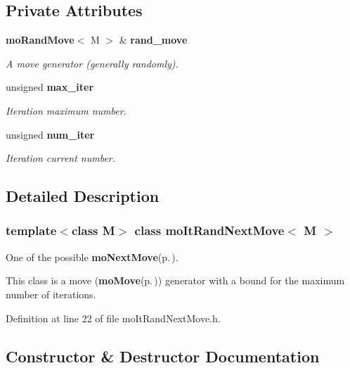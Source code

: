 \subsection*{Private Attributes}
\begin{CompactItemize}
\item 
{\bf mo\-Rand\-Move}$<$ M $>$ \& {\bf rand\_\-move}\label{classmo_it_rand_next_move_ef9410ec5e7dfa7f002e05967931c459}

\begin{CompactList}\small\item\em A move generator (generally randomly). \item\end{CompactList}\item 
unsigned {\bf max\_\-iter}\label{classmo_it_rand_next_move_3c476f7cc089b171493c52965f920542}

\begin{CompactList}\small\item\em Iteration maximum number. \item\end{CompactList}\item 
unsigned {\bf num\_\-iter}\label{classmo_it_rand_next_move_c3551d7910cf351d63f0f3427fc18504}

\begin{CompactList}\small\item\em Iteration current number. \item\end{CompactList}\end{CompactItemize}


\subsection{Detailed Description}
\subsubsection*{template$<$class M$>$ class mo\-It\-Rand\-Next\-Move$<$ M $>$}

One of the possible {\bf mo\-Next\-Move}{\rm (p.\,\pageref{classmo_next_move})}. 

This class is a move ({\bf mo\-Move}{\rm (p.\,\pageref{classmo_move})}) generator with a bound for the maximum number of iterations. 



Definition at line 22 of file mo\-It\-Rand\-Next\-Move.h.

\subsection{Constructor \& Destructor Documentation}
